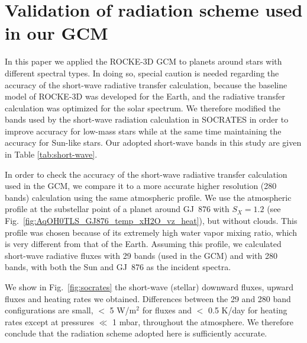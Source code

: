 \documentclass[11pt,numberedappendix,twocolappendix,]{emulateapj}
\def\wv{water vapor}
\begin{document}
\section{Validation of radiation scheme used in our GCM}
\label{ap:radiation}

In this paper we applied the ROCKE-3D GCM to planets around stars with different spectral types. 
In doing so, special caution is needed regarding the accuracy of the short-wave radiative transfer calculation, because the baseline model of ROCKE-3D was  developed for the Earth, and the radiative transfer calculation was optimized for the solar spectrum. 
We therefore modified the bands used by the short-wave radiation calculation in SOCRATES in order to improve accuracy for low-mass stars while at the same time maintaining the accuracy for Sun-like stars.
Our adopted short-wave bands in this study are given in Table \ref{tab:short-wave}.

In order to check the accuracy of the short-wave radiative transfer calculation used in the GCM, we compare it to a more accurate higher resolution (280 bands) calculation using the same atmospheric profile. 
We use the atmospheric profile at the substellar point of a planet around GJ~876 with $S_X=1.2$ (see Fig.~\ref{fig:AqOH0TLS_GJ876_temp_xH2O_vz_heat}), but without clouds. 
This profile was chosen because of its extremely high \wv{} mixing ratio, which is very different from that of the Earth. 
Assuming this profile, we calculated short-wave radiative fluxes with 29 bands (used in the GCM) and with 280 bands, with both the Sun and GJ~876 as the incident spectra.

We show in Fig.~\ref{fig:socrates} the short-wave (stellar) downward fluxes, upward fluxes and heating rates we obtained.
Differences between the 29 and 280 band configurations are small, $<$ 5 W/m$^2$ for fluxes and $<$ 0.5 K/day for heating rates except at pressures $\ll$ 1 mbar, throughout the atmosphere. We therefore conclude that the radiation scheme adopted here is sufficiently accurate.
\end{document}
